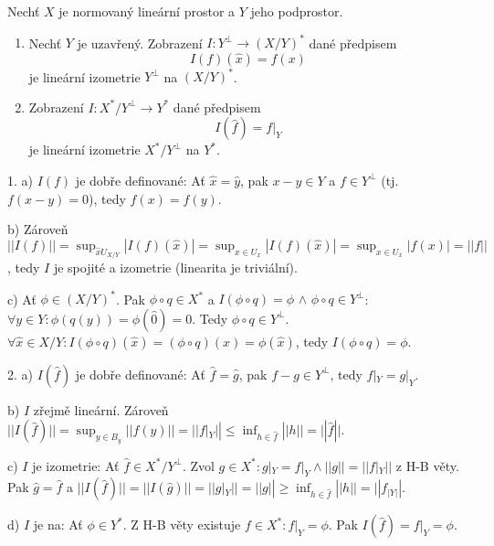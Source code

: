 \documentclass[12pt]{article}					%
\begin{document}
\begin{veta}
	Nechť $X$ je normovaný lineární prostor a $Y$ jeho podprostor.

	\begin{enumerate}
		\item Nechť $Y$ je uzavřený. Zobrazení $I: Y^\perp \rightarrow (X / Y)^*$ dané předpisem
			$$ I(f)(\hat{x}) = f(x) $$
			je lineární izometrie $Y^\perp$ na $(X / Y)^*$.

		\item Zobrazení $I: X^* / Y^\perp \rightarrow Y^*$ dané předpisem
			$$ I(\hat{f}) = f|_Y $$
			je lineární izometrie $X^* / Y^\perp$ na $Y^*$.
	\end{enumerate}

	\begin{dukazin}
		1. a) $I(f)$ je dobře definované: Ať $\hat{x} = \hat{y}$, pak $x - y \in Y$ a $f \in Y^\perp$ (tj. $f(x - y) = 0$), tedy $f(x) = f(y)$.

		b) Zároveň $||I(f)|| = \sup_{\hat{x} U_{X / Y}} |I(f)(\hat{x})| = \sup_{x \in U_x} |I(f)(\hat{x})| = \sup_{x \in U_x} |f(x)| = ||f||$, tedy $I$ je spojité a izometrie (linearita je triviální).

		c) Ať $\phi \in (X / Y)^*$. Pak $\phi \circ q \in X^*$ a $I(\phi \circ q) = \phi$ $\land$ $\phi \circ q \in Y^\perp$: $\forall y \in Y: \phi(q(y)) = \phi(\hat{0}) = 0$. Tedy $\phi \circ q \in Y^\perp$. $\forall \hat{x} \in X / Y: I(\phi\circ q)(\hat{x}) = (\phi \circ q)(x) = \phi(\hat{x})$, tedy $I(\phi \circ q) = \phi$.

		2. a) $I(\hat{f})$ je dobře definované: Ať $\hat{f} = \hat{g}$, pak $f - g \in Y^\perp$, tedy $f|_Y = g|_Y$.

		b) $I$ zřejmě lineární. Zároveň $||I(\hat{f})|| = \sup_{y \in B_y} ||f(y)|| = ||f|_Y|| ≤ \inf_{h \in \hat{f}} ||h|| = ||\hat{f}||$.

		c) $I$ je izometrie: Ať $\hat{f} \in X^* / Y^\perp$. Zvol $g \in X^*: g|_Y = f|_Y \land ||g|| = ||f|_Y||$ z H-B věty. Pak $\hat{g} = \hat{f}$ a $||I(\hat{f})|| = ||I(\hat{g})|| = ||g|_Y|| = ||g|| ≥ \inf_{h \in \hat{f}} ||h|| = ||f_|Y||$.

		d) $I$ je na: Ať $\phi \in Y^*$. Z H-B věty existuje $f \in X^*: f|_Y = \phi$. Pak $I(\hat{f}) = f|_Y = \phi$.
	\end{dukazin}
\end{veta}
\end{document}
